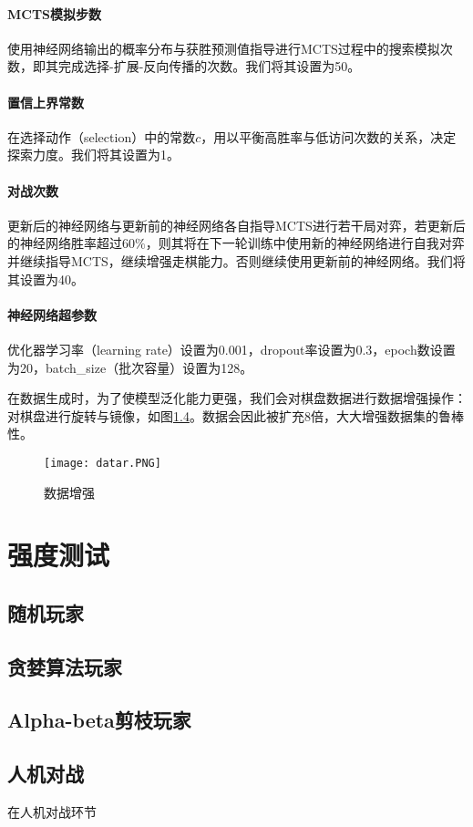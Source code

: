 \paragraph{MCTS模拟步数}
使用神经网络输出的概率分布与获胜预测值指导进行MCTS过程中的搜索模拟次数，即其完成选择-扩展-反向传播的次数。我们将其设置为50。
\paragraph{置信上界常数}
在选择动作（selection）中的常数$c$，用以平衡高胜率与低访问次数的关系，决定探索力度。我们将其设置为1。
\paragraph{对战次数}
更新后的神经网络与更新前的神经网络各自指导MCTS进行若干局对弈，若更新后的神经网络胜率超过$60\%$，则其将在下一轮训练中使用新的神经网络进行自我对弈并继续指导MCTS，继续增强走棋能力。否则继续使用更新前的神经网络。我们将其设置为40。
\paragraph{神经网络超参数}
优化器学习率（learning rate）设置为0.001，dropout率设置为0.3，epoch数设置为20，batch_size（批次容量）设置为128。

在数据生成时，为了使模型泛化能力更强，我们会对棋盘数据进行数据增强操作：对棋盘进行旋转与镜像，如图\ref{}。数据会因此被扩充8倍，大大增强数据集的鲁棒性。
\begin{figure}[H]
    \centering
    \texttt{[image: datar.PNG]}
    \caption[datar]{%
        数据增强%
      }
    \label{fig:datar}
\end{figure}
\section{强度测试}

\subsection{随机玩家}

\subsection{贪婪算法玩家}

\subsection{Alpha-beta剪枝玩家}

\subsection{人机对战}
在人机对战环节

